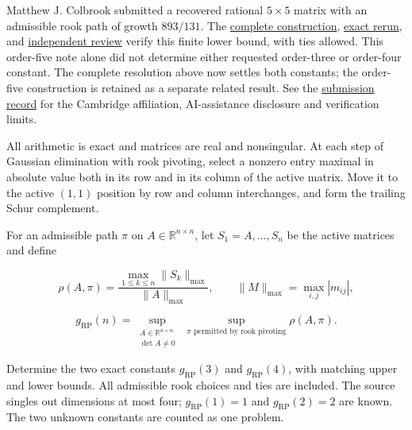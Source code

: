 \documentclass[11pt,a4paper]{article}
\makeatletter
\renewcommand{\subsection}{\Needspace{4\baselineskip}\@startsection{subsection}{2}{0pt}{9pt plus 1pt minus 1pt}{3pt}{\sffamily\bfseries\normalsize\color{ink}}}
\makeatother
\begin{document}
Matthew J. Colbrook submitted a recovered rational \(5\times5\) matrix
with an admissible rook path of growth \(893/131\). The
\href{https://github.com/ajt60gaibb/OpenProblemsInNLA/blob/main/references/colbrook-recovered-2026-09-11/submitted/research/rook_partial.md}{complete
construction},
\href{https://github.com/ajt60gaibb/OpenProblemsInNLA/blob/main/references/colbrook-recovered-2026-09-11/verification/fresh-rook-results.json}{exact
rerun}, and
\href{https://github.com/ajt60gaibb/OpenProblemsInNLA/blob/main/references/colbrook-recovered-2026-09-11/verification/reviews/rook-review.md}{independent
review} verify this finite lower bound, with ties allowed. This
order-five note alone did not determine either requested order-three or
order-four constant. The complete resolution above now settles both
constants; the order-five construction is retained as a separate related
result. See the
\href{https://github.com/ajt60gaibb/OpenProblemsInNLA/blob/main/references/colbrook-recovered-2026-09-11/README.md}{submission
record} for the Cambridge affiliation, AI-assistance disclosure and
verification limits.

\subsection{Problem statement}\label{problem-statement}

All arithmetic is exact and matrices are real and nonsingular. At each
step of Gaussian elimination with rook pivoting, select a nonzero entry
maximal in absolute value both in its row and in its column of the
active matrix. Move it to the active \((1,1)\) position by row and
column interchanges, and form the trailing Schur complement.

For an admissible path \(\pi\) on \(A\in\mathbb R^{n\times n}\), let
\(S_1=A,\ldots,S_n\) be the active matrices and define

\[\rho(A,\pi)=\frac{\max_{1\le k\le n}\|S_k\|_{\max}}{\|A\|_{\max}},
\qquad \|M\|_{\max}=\max_{i,j}|m_{ij}|,\]

\[g_{\mathrm{RP}}(n)=\sup_{\substack{A\in\mathbb R^{n\times n}\\\det A\ne0}}\
\sup_{\pi\text{ permitted by rook pivoting}}\rho(A,\pi).\]

Determine the two exact constants \(g_{\mathrm{RP}}(3)\) and
\(g_{\mathrm{RP}}(4)\), with matching upper and lower bounds. All
admissible rook choices and ties are included. The source singles out
dimensions at most four; \(g_{\mathrm{RP}}(1)=1\) and
\(g_{\mathrm{RP}}(2)=2\) are known. The two unknown constants are
counted as one problem.
\end{document}
